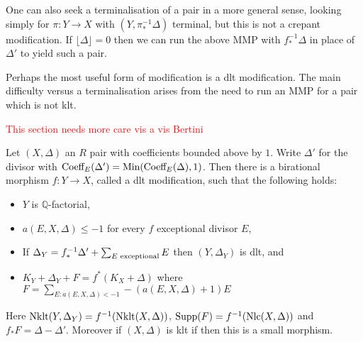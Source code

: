 \documentclass[a4paper,12pt]{book}
\newcommand\myworries[1]{\textcolor{red}{#1}}
\begin{document}
\begin{remark}
	
	One can also seek a terminalisation of a pair in a more general sense, looking simply for $\pi:Y \to X$ with $(Y,\pi_{*}^{-1}\Delta)$ terminal, but this is not a crepant modification. If $\lfloor \Delta \rfloor=0$ then we can run the above MMP with $f^{-1}_{*}\Delta$ in place of $\Delta'$ to yield such a pair.
	
	\end{remark}


Perhaps the most useful form of modification is a dlt modification. The main difficulty versus a terminalisation arises from the need to run an MMP for a pair which is not klt.

\myworries{This section needs more care vis a vis Bertini}

\begin{theorem}
	Let $(X,\Delta)$ an $R$ pair with coefficients bounded above by $1$. Write $\Delta'$ for the divisor with $\textup{Coeff}_{E}(\Delta')=\textup{Min}(\textup{Coeff}_{E}(\Delta),1)$. Then there is a birational morphism $f:Y \to X$, called a dlt modification, such that the following holds:
	\begin{itemize}
		\item $Y$ is $\mathbb{Q}$-factorial,
		\item $a(E,X,\Delta) \leq -1$ for every $f$ exceptional divisor $E$,
		\item If $\Delta_{Y}=f^{-1}_{*}\Delta' + \sum_{E \textup{ exceptional}} E$ then $(Y,\Delta_{Y})$ is dlt, and
		\item $K_{Y}+\Delta_{Y}+F=f^{*}(K_{X}+\Delta)$ where $F= \sum_{E:a(E,X,\Delta)<-1} -(a(E,X,\Delta)+1)E$
	\end{itemize}
	Here $\textup{Nklt}(Y,\Delta_{Y})=f^{-1}(\textup{Nklt}(X,\Delta))$, $\text{Supp}(F)=f^{-1}(\textup{Nlc}(X,\Delta))$ and $f_{*}F=\Delta-\Delta'$. Moreover if $(X,\Delta)$ is klt if then this is a small morphism.
\end{theorem}
\end{document}
